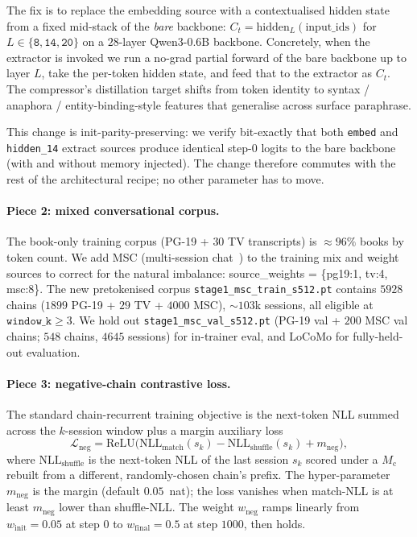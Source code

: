 \documentclass{article}
\newcommand{\Mc}{M_{\text{c}}}
\begin{document}
The fix is to replace the embedding source with a contextualised
hidden state from a fixed mid-stack of the \emph{bare} backbone:
$C_t = \mathrm{hidden}_L(\text{input\_ids})$ for $L \in
\{\texttt{8}, \texttt{14}, \texttt{20}\}$ on a $28$-layer
Qwen3-0.6B backbone. Concretely, when the extractor is invoked we
run a no-grad partial forward of the bare backbone up to layer $L$,
take the per-token hidden state, and feed that to the extractor as
$C_t$. The compressor's distillation target shifts from token
identity to syntax / anaphora / entity-binding-style features that
generalise across surface paraphrase.

This change is init-parity-preserving: we verify bit-exactly that
both \texttt{embed} and \texttt{hidden\_14} extract sources produce
identical step-$0$ logits to the bare backbone (with and without
memory injected). The change therefore commutes with the rest of
the architectural recipe; no other parameter has to move.

\paragraph{Piece 2: mixed conversational corpus.}
The book-only training corpus (PG-19 + $30$ TV transcripts) is
$\approx 96\%$ books by token count. We add MSC (multi-session
chat~\cite{xu2022msc}) to the training mix and weight sources to
correct for the natural imbalance:
\textsf{source\_weights = \{pg19:1, tv:4, msc:8\}}.
The new pretokenised corpus
\texttt{stage1\_msc\_train\_s512.pt} contains $5928$ chains
($1899$ PG-19 + $29$ TV + $4000$ MSC), $\sim$$103$k sessions, all
eligible at $\texttt{window\_k}{\ge}3$. We hold out
\texttt{stage1\_msc\_val\_s512.pt} (PG-19 val + $200$ MSC val
chains; $548$ chains, $4645$ sessions) for in-trainer eval, and
LoCoMo for fully-held-out evaluation.

\paragraph{Piece 3: negative-chain contrastive loss.}
The standard chain-recurrent training objective is the next-token
NLL summed across the $k$-session window plus a margin auxiliary
loss
\[
\mathcal{L}_{\text{neg}} = \mathrm{ReLU}\!\bigl(\mathrm{NLL}_{\text{match}}(s_k) -
                                                \mathrm{NLL}_{\text{shuffle}}(s_k) + m_{\text{neg}}\bigr),
\]
where $\mathrm{NLL}_{\text{shuffle}}$ is the next-token NLL of the
last session $s_k$ scored under a $\Mc$ rebuilt from a different,
randomly-chosen chain's prefix. The hyper-parameter $m_{\text{neg}}$
is the margin (default $0.05$~nat); the loss vanishes when
match-NLL is at least $m_{\text{neg}}$ lower than shuffle-NLL. The
weight $w_{\text{neg}}$ ramps linearly from $w_{\text{init}}{=}0.05$
at step $0$ to $w_{\text{final}}{=}0.5$ at step $1000$, then holds.
\end{document}
